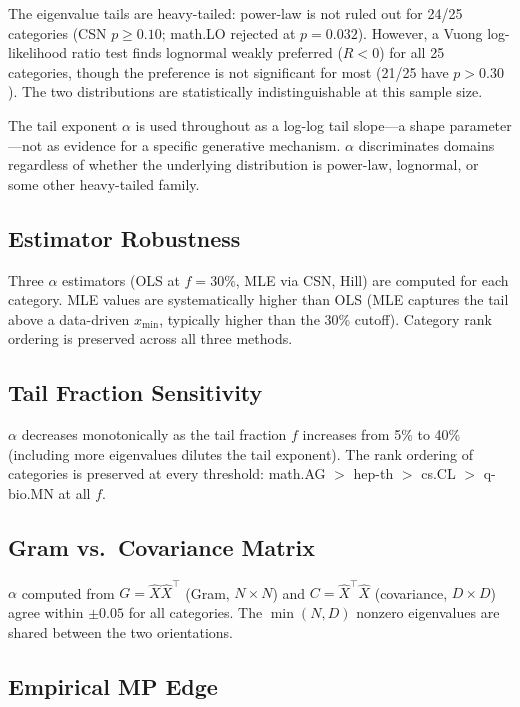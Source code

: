 \documentclass[12pt,letterpaper]{article}
\newcommand{\al}{\alpha}
\begin{document}
The eigenvalue tails are heavy-tailed: power-law is not ruled out
for 24/25 categories (CSN $p \geq 0.10$; math.LO rejected at
$p = 0.032$).  However, a Vuong log-likelihood ratio test
\citep{clauset2009} finds lognormal weakly preferred ($R < 0$) for
all 25 categories, though the preference is not significant for
most (21/25 have $p > 0.30$).  The two distributions are
statistically indistinguishable at this sample size.

The tail exponent $\al$ is used throughout as a log-log tail
slope---a shape parameter---not as evidence for a specific
generative mechanism.  $\al$ discriminates domains regardless of
whether the underlying distribution is power-law, lognormal, or
some other heavy-tailed family.

\subsection{Estimator Robustness}

Three $\al$ estimators (OLS at $f=30\%$, MLE via CSN, Hill) are
computed for each category.  MLE values are systematically higher
than OLS (MLE captures the tail above a data-driven $x_{\min}$,
typically higher than the 30\% cutoff).  Category rank ordering is
preserved across all three methods.

\subsection{Tail Fraction Sensitivity}
\label{sec:tail_sensitivity}

$\al$ decreases monotonically as the tail fraction $f$ increases
from 5\% to 40\% (including more eigenvalues dilutes the tail
exponent).  The rank ordering of categories is preserved at every
threshold: math.AG $>$ hep-th $>$ cs.CL $>$ q-bio.MN at all $f$.

\subsection{Gram vs.\ Covariance Matrix}

$\al$ computed from $G = \hat{X}\hat{X}^\top$ (Gram, $N \times N$)
and $C = \hat{X}^\top\hat{X}$ (covariance, $D \times D$) agree
within $\pm 0.05$ for all categories.  The $\min(N,D)$ nonzero
eigenvalues are shared between the two orientations.

\subsection{Empirical MP Edge}
\end{document}
